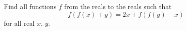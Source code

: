 Find all functions $f$ from the reals to the reals such that \[f\left(f\left(x\right)+y\right)=2x+f\left(f\left(y\right)-x\right)\] for all real $x$, $y$.